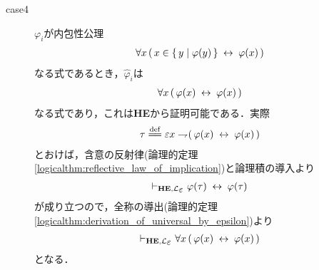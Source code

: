 \begin{metaprf}
\begin{description}
			\item[case4] $\varphi_{i}$が内包性公理
				\begin{align}
					\forall x\, (\, x \in \{\, y \mid \varphi(y)\, \} \hspace{0.25em}\leftrightarrow\hspace{0.25em} \varphi(x)\, )
				\end{align}
				なる式であるとき，$\widehat{\varphi}_{i}$は
				\begin{align}
					\forall x\, (\, \varphi(x) \hspace{0.25em}\leftrightarrow\hspace{0.25em} \varphi(x)\, )
				\end{align}
				なる式であり，これは{\bf HE}から証明可能である．実際
				\begin{align}
					\tau \defeq \varepsilon x \negation (\, \varphi(x) \lrarrow \varphi(x)\, )
				\end{align}
				とおけば，含意の反射律(論理的定理\ref{logicalthm:reflective_law_of_implication})と論理積の導入より
				\begin{align}
					\provable{\mbox{{\bf HE}},\lang{\varepsilon}} \varphi(\tau) \lrarrow \varphi(\tau)
				\end{align}
				が成り立つので，全称の導出(論理的定理\ref{logicalthm:derivation_of_universal_by_epsilon})より
				\begin{align}
					\provable{\mbox{{\bf HE}},\lang{\varepsilon}} \forall x\, (\, \varphi(x) \lrarrow \varphi(x)\, )
				\end{align}
				となる．
			

\end{description}
\end{metaprf}
